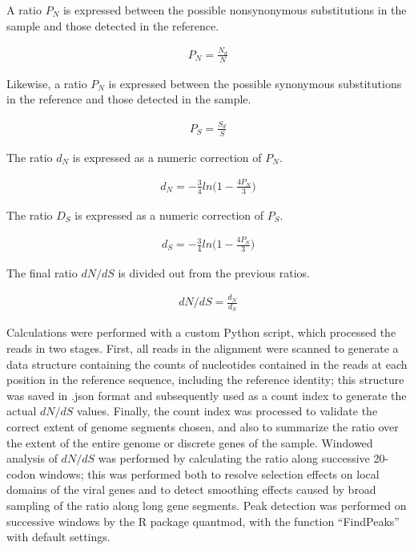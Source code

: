 A ratio $P_N$ is expressed between the possible nonsynonymous substitutions in the sample and those detected in the reference.

	\begin{align*}
	P_N = \frac{N_d}{N}
	\end{align*}

Likewise, a ratio $P_N$ is expressed between the possible synonymous substitutions in the reference and those detected in the sample.
	
	\begin{align*}
	P_S = \frac{S_d}{S}
	\end{align*}

The ratio $d_N$ is expressed as a numeric correction of $P_N$.
	
	\begin{align*}
	d_N = -\frac{3}{4}ln(1-{\frac{{4P}_N}{3})}
	\end{align*}

The ratio $D_S$ is expressed as a numeric correction of $P_S$.
	
	\begin{align*}
	d_S = -\frac{3}{4}ln(1-{\frac{{4P}_S}{3})}
	\end{align*}

The final ratio $dN/dS$ is divided out from the previous ratios.
	
	\begin{align*}
	dN/dS = \frac{d_N}{d_S}
	\end{align*}

Calculations were performed with a custom Python script, which processed the reads in two stages. First, all reads in the alignment were scanned to generate a data structure containing the counts of nucleotides contained in the reads at each position in the reference sequence, including the reference identity; this structure was saved in .json format and subsequently used as a count index to generate the actual $dN/dS$ values. Finally, the count index was processed to validate the correct extent of genome segments chosen, and also to summarize the ratio over the extent of the entire genome or discrete genes of the sample. Windowed analysis of $dN/dS$ was performed by calculating the ratio along successive 20-codon windows; this was performed both to resolve selection effects on local domains of the viral genes and to detect smoothing effects caused by broad sampling of the ratio along long gene segments. Peak detection was performed on successive windows by the R package quantmod, with the function ``FindPeaks'' with default settings.

